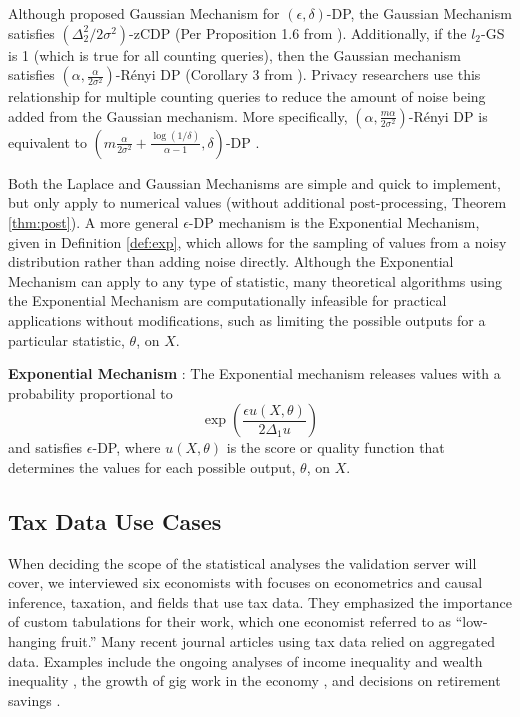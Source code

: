 Although \citet{dwork2014algorithmic} proposed Gaussian Mechanism for $(\epsilon,\delta)$-DP, the Gaussian Mechanism satisfies $(\Delta^2_2/2\sigma^2)$-zCDP (Per Proposition 1.6 from \citet{bun2016concentrated}). Additionally, if the $l_2$-GS is 1 (which is true for all counting queries), then the Gaussian mechanism satisfies $\left(\alpha, \frac{\alpha}{2\sigma^2}\right)$-R\'enyi DP (Corollary 3 from  \citet{mironov2017renyi}). Privacy researchers use this relationship for multiple counting queries to reduce the amount of noise being added from the Gaussian mechanism. More specifically, $\left(\alpha, \frac{m\alpha}{2\sigma^2}\right)$-R\'enyi DP is equivalent to $\left(m\frac{\alpha}{2\sigma^2}+\frac{\log(1/\delta)}{\alpha-1}, \delta\right)$-DP \citep{mironov2017renyi,wang2019subsampled}.

Both the Laplace and Gaussian Mechanisms are simple and quick to implement, but only apply to numerical values (without additional post-processing, Theorem \ref{thm:post}). A more general $\epsilon$-DP mechanism is the Exponential Mechanism, given in Definition \ref{def:exp}, which allows for the sampling of values from a noisy distribution rather than adding noise directly. Although the Exponential Mechanism can apply to any type of statistic, many theoretical algorithms using the Exponential Mechanism are computationally infeasible for practical applications without modifications, such as limiting the possible outputs for a particular statistic, $\theta$, on $X$.

\begin{defn}\label{def:exp} \textbf{Exponential Mechanism} \citep{mcsherry2007mechanism}:
    The Exponential mechanism releases values with a probability proportional to
        \begin{equation}\label{eqn:exp}
            \exp \left(\frac{\epsilon u(X, \theta)}{2\Delta_1 u}\right)
        \end{equation}
    and satisfies $\epsilon$-DP, where $u(X,\theta)$ is the score or quality function that determines the values for each possible output, $\theta$, on $X$.
\end{defn}

\subsection{Tax Data Use Cases}\label{subsec:data}
When deciding the scope of the statistical analyses the validation server will cover, we interviewed six economists with focuses on econometrics and causal inference, taxation, and fields that use tax data. They emphasized the importance of custom tabulations for their work, which one economist referred to as ``low-hanging fruit.'' Many recent journal articles using tax data relied on aggregated data. Examples include the ongoing analyses of income inequality \citep{auten2018income} and wealth inequality \citep{smith2019top}, the growth of gig work in the economy \citep{collins2019gig}, and decisions on retirement savings \citep{brady2020reconciling}.

